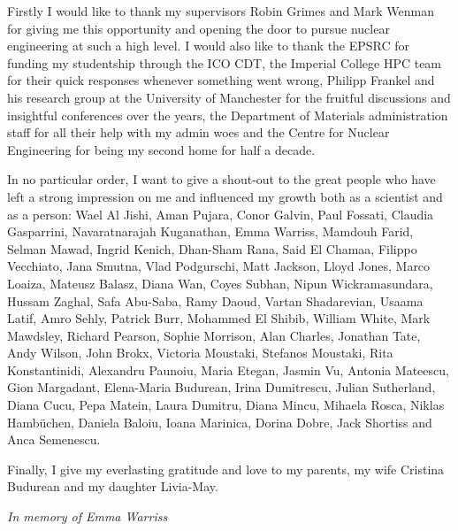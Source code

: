 \cleardoublepage


\begin{acknowledgements}

Firstly I would like to thank my supervisors Robin Grimes and Mark Wenman for giving me this opportunity and opening the door to pursue nuclear engineering at such a high level. I would also like to thank the EPSRC for funding my studentship through the ICO CDT, the Imperial College HPC team for their quick responses whenever something went wrong, Philipp Frankel and his research group at the University of Manchester for the fruitful discussions and insightful conferences over the years, the Department of Materials administration staff for all their help with my admin woes and the Centre for Nuclear Engineering for being my second home for half a decade.

In no particular order, I want to give a shout-out to the great people who have left a strong impression on me and influenced my growth both as a scientist and as a person: Wael Al Jishi, Aman Pujara, Conor Galvin, Paul Fossati, Claudia Gasparrini, Navaratnarajah Kuganathan, Emma Warriss, Mamdouh Farid, Selman Mawad, Ingrid Kenich, Dhan-Sham Rana, Said El Chamaa, Filippo Vecchiato, Jana Smutna, Vlad Podgurschi, Matt Jackson, Lloyd Jones, Marco Loaiza, Mateusz Balasz, Diana Wan, Coyes Subhan, Nipun Wickramasundara, Hussam Zaghal, Safa Abu-Saba, Ramy Daoud, Vartan Shadarevian, Usaama Latif, Amro Sehly, Patrick Burr, Mohammed El Shibib, William White, Mark Mawdsley, Richard Pearson, Sophie Morrison, Alan Charles, Jonathan Tate, Andy Wilson, John Brokx, Victoria Moustaki, Stefanos Moustaki, Rita Konstantinidi, Alexandru Paunoiu, Maria Etegan, Jasmin Vu, Antonia Mateescu, Gion Margadant, Elena-Maria Budurean, Irina Dumitrescu, Julian Sutherland, Diana Cucu, Pepa Matein, Laura Dumitru, Diana Mincu, Mihaela Rosca, Niklas Hamb\"{u}chen, Daniela Baloiu, Ioana Marinica, Dorina Dobre, Jack Shortiss and Anca Semenescu. 

Finally, I give my everlasting gratitude and love to my parents, my wife Cristina Budurean and my daughter Livia-May.

\clearpage

\begin{center}
\emph{In memory of Emma Warriss}
\end{center}

\end{acknowledgements}